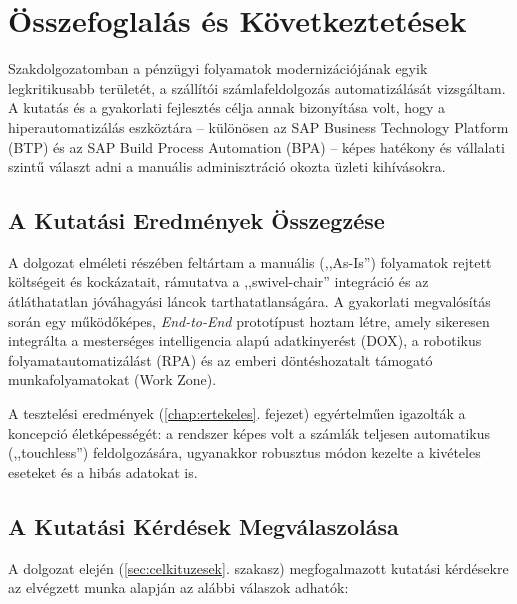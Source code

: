 \chapter{Összefoglalás és Következtetések}
\label{chap:summary}

Szakdolgozatomban a pénzügyi folyamatok modernizációjának egyik legkritikusabb területét, a szállítói számlafeldolgozás automatizálását vizsgáltam. A kutatás és a gyakorlati fejlesztés célja annak bizonyítása volt, hogy a hiperautomatizálás eszköztára – különösen az SAP Business Technology Platform (BTP) és az SAP Build Process Automation (BPA) – képes hatékony és vállalati szintű választ adni a manuális adminisztráció okozta üzleti kihívásokra.

\section{A Kutatási Eredmények Összegzése}
A dolgozat elméleti részében feltártam a manuális (,,As-Is'') folyamatok rejtett költségeit és kockázatait, rámutatva a ,,swivel-chair'' integráció és az átláthatatlan jóváhagyási láncok tarthatatlanságára. A gyakorlati megvalósítás során egy működőképes, \textit{End-to-End} prototípust hoztam létre, amely sikeresen integrálta a mesterséges intelligencia alapú adatkinyerést (DOX), a robotikus folyamatautomatizálást (RPA) és az emberi döntéshozatalt támogató munkafolyamatokat (Work Zone).

A tesztelési eredmények (\ref{chap:ertekeles}. fejezet) egyértelműen igazolták a koncepció életképességét: a rendszer képes volt a számlák teljesen automatikus (,,touchless'') feldolgozására, ugyanakkor robusztus módon kezelte a kivételes eseteket és a hibás adatokat is.

\section{A Kutatási Kérdések Megválaszolása}
A dolgozat elején (\ref{sec:celkituzesek}. szakasz) megfogalmazott kutatási kérdésekre az elvégzett munka alapján az alábbi válaszok adhatók:

